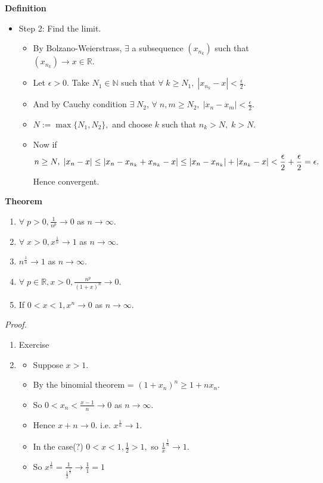 \documentclass[12pt]{article}
\begin{document}
\begin{block}{\bf Definition}
\begin{itemize}
    \item Step 2: Find the limit.
    \begin{itemize}
        \item By Bolzano-Weierstrass, $\exists$ a subsequence $(x_{n_k})$ such that $(x_{n_k}) \rightarrow x \in \mathbb{R}$.
        \item Let $\epsilon > 0$. Take $N_1 \in \mathbb{N}$ such that $\forall\; k\ge N_1,\; |x_{n_k} - x| <\frac{\epsilon}{2}.$
        \item And by Cauchy condition $\exists\; N_2$, $\forall\; n,m \ge N_2,\; |x_n -x_m| <\frac{\epsilon}{2}.$
        \item $N:= \max\{N_1,N_2\},$ and choose $k$ such that $n_k>N,\;k>N$.
        \item Now if $$n \ge N,\; |x_n -x| \le |x_n-x_{n_k}+x_{n_k}-x|\le |x_n -x_{n_k}| + |x_{n_k} - x|<\frac{\epsilon}{2}+\frac{\epsilon}{2} = \epsilon.\hfill$$ Hence convergent.
    \end{itemize}
\end{itemize}


\newpage
\textbf{Theorem}
\begin{enumerate}[label=(\roman*)]
    \item $\forall\;p>0, \frac{1}{n^p} \rightarrow 0$ as $n \rightarrow \infty$.
    \item $\forall\;x>0, x^{\frac{1}{n}} \rightarrow 1$ as $n \rightarrow \infty$.
    \item $n^{\frac{1}{n}} \rightarrow 1$ as $n \rightarrow \infty$.
    \item $\forall\; p\in \mathbb{R}, x>0, \frac{n^p}{(1+x)^n} \rightarrow 0$.
    \item If $0<x<1, x^n \rightarrow 0$ as $n \rightarrow \infty$.
\end{enumerate}

{\sl Proof.}
\begin{enumerate}[label=(\roman*)]
    \item Exercise
    \item 
    \begin{itemize}
        \item Suppose $x>1$.
        \item By the binomial theorem = $(1+x_n)^n \ge 1+nx_n$.
        \item So $0 < x_n < \frac{x-1}{n} \rightarrow 0$ as $n\rightarrow \infty$.
        \item Hence $x+n \rightarrow 0$. i.e. $x^{\frac{1}{n}} \rightarrow 1$.
        \item In the case(?) $0<x<1, \frac{1}{2} > 1,$ so $\frac{1}{x}^{\frac{1}{n}} \rightarrow 1$.
        \item So $x^{\frac{1}{n}} = \frac{1}{\frac{1}{2}^{\frac{1}{n}}} \rightarrow \frac{1}{1} = 1$
    \end{itemize}


\end{enumerate}
\end{block}
\end{document}
